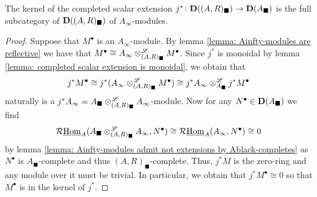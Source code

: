 %

\begin{lemma}
	The kernel of the completed scalar extension $j^\ast\colon {{\mathbf{D}}((A, R)_\blacksquare)} \to {{\mathbf{D}}(A_\blacksquare)}$ is the full subcategory of ${{\mathbf{D}}((A, R)_\blacksquare)}$ of $A_\infty$-modules.
\end{lemma}
\begin{proof}
	Suppose that $M^\bullet$ is an $A_\infty$-module. By lemma \ref{lemma: Ainfty-modules are reflective} we have that $M^\bullet \cong A_\infty\otimes^{\mathscr{L}}_{(A, R)_\blacksquare} M^\bullet$. Since $j^\ast$ is monoidal by lemma \ref{lemma: completed scalar extension is monoidal}, we obtain that
	$$j^\ast M^\bullet \cong j^\ast(A_\infty\otimes^{\mathscr{L}}_{(A, R)_\blacksquare}M^\bullet)\cong j^\ast A_\infty \otimes^{\mathscr{L}}_{A_\blacksquare} j^\ast M^\bullet$$
	naturally is a $j^\ast A_\infty = A_\blacksquare \otimes^{\mathscr{L}}_{(A, R)_\blacksquare} A_\infty$-module. Now for any $N^\bullet \in {{\mathbf{D}}(A_\blacksquare)}$ we find
	$$\mathcal{R}{\underline{\operatorname{Hom}}}_A(A_\blacksquare\otimes^{\mathscr{L}}_{(A, R)_\blacksquare} A_\infty, N^\bullet)\cong \mathcal{R}{\underline{\operatorname{Hom}}}_A(A_\infty, N^\bullet) \cong 0$$
	by lemma \ref{lemma: Ainfty-modules admit not extensions by Ablack-completes} as $N^\bullet$ is $A_\blacksquare$-complete and thus $(A, R)_\blacksquare$-complete. Thus, $j^\ast M$ is the zero-ring and any module over it must be trivial. In particular, we obtain that $j^\ast M^\bullet \cong 0$ so that $M^\bullet$ is in the kernel of $j^\ast$.
	

\end{proof}

